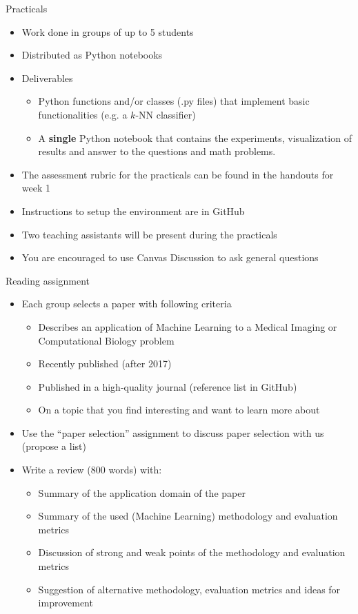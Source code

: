 \documentclass[notes]{beamer}          %
\begin{document}
\begin{frame}{Practicals}
\begin{itemize}
    \item Work done in groups of up to 5 students
    \item Distributed as Python notebooks
    \item Deliverables
    \begin{itemize}
        \item Python functions and/or classes (.py files) that implement basic functionalities (e.g. a $k$-NN classifier)
        \item A \textbf{single} Python notebook that contains the experiments, visualization of results and answer to the questions and math problems.
    \end{itemize}
    \item The assessment rubric for the practicals can be found in the handouts for week 1
    \item Instructions to setup the environment are in GitHub
    \item Two teaching assistants will be present during the practicals
    	\item You are encouraged to use Canvas Discussion to ask general questions
\end{itemize}    
\end{frame}

\begin{frame}{Reading assignment}
\begin{itemize}
    \item Each group selects a paper with following criteria
    \begin{itemize}
        \item Describes an application of Machine Learning to a Medical Imaging or Computational Biology problem
		\item Recently published (after 2017)
		\item Published in a high-quality journal (reference list in GitHub)
		\item	 On a topic that you find interesting and want to learn more about
    \end{itemize}
    \item Use the ``paper selection'' assignment to discuss paper selection with us (propose a list)
    \item Write a review (800 words) with:
    \begin{itemize}
    		\item Summary of the application domain of the paper
    		\item Summary of the used (Machine Learning) methodology and evaluation metrics
		\item Discussion of strong and weak points of the methodology and evaluation metrics
		\item Suggestion of alternative methodology, evaluation metrics and ideas for improvement
    \end{itemize}
\end{itemize}    
\end{frame}
\end{document}
